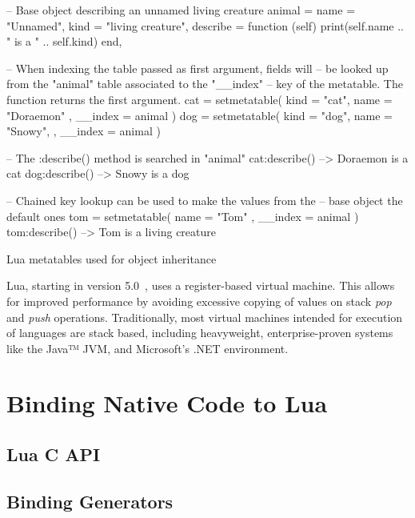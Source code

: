 \begin{listing}
  \begin{luacode}
    -- Base object describing an unnamed living creature
    animal = {
      name = "Unnamed",
      kind = "living creature",
      describe = function (self)
        print(self.name .. " is a " .. self.kind)
      end,
    }

    -- When indexing the table passed as first argument, fields will
    -- be looked up from the "animal" table associated to the "__index"
    -- key of the metatable. The function returns the first argument.
    cat = setmetatable({ kind = "cat", name = "Doraemon" },
                       { __index = animal })
    dog = setmetatable({ kind = "dog", name = "Snowy", },
                       { __index = animal })

    -- The :describe() method is searched in "animal"
    cat:describe()  --> Doraemon is a cat
    dog:describe()  --> Snowy is a dog

    -- Chained key lookup can be used to make the values from the
    -- base object the default ones
    tom = setmetatable({ name = "Tom" }, { __index = animal  })
    tom:describe()  --> Tom is a living creature
  \end{luacode}
  \caption{Lua metatables used for object inheritance}
  \label{lst:lua-example-meta-oo}
\end{listing}

Lua, starting in version 5.0~\cite{lua50-impl}, uses a register-based virtual
machine. This allows for improved performance by avoiding excessive copying of
values on stack \emph{pop} and \emph{push} operations. Traditionally, most
virtual machines intended for execution of languages are stack based,
including heavyweight, enterprise-proven systems like the Java™ JVM, and
Microsoft's .NET environment.


\section{Binding Native Code to Lua}

\subsection{Lua C API}
	\label{sec:lua-c-api}


\subsection{Binding Generators}

